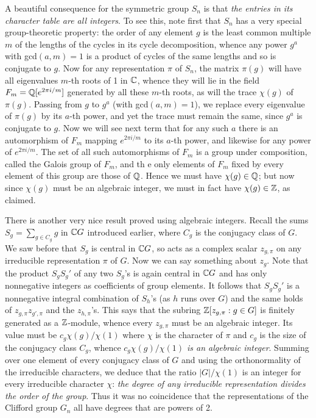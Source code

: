 \documentclass[10pt]{article}
\begin{document}
A beautiful consequence for the symmetric group $S_n$ is that {\sl the
  entries in its character table are all integers}. To see this, note
first that $S_n$ has a very special group-theoretic property: the order
of any element $g$ is the least common multiple $m$ of the lengths of
the cycles in its cycle decomposition, whence any power $g^a$ with
gcd$(a,m) = 1$ is a product of cycles of the same lengths and so is
conjugate to $g$. Now for any representation $\pi$ of $S_n$, the matrix
$\pi(g)$ will have all eigenvalues $m$-th roots of 1 in $\Bbb C$, whence
they will lie in the field $F_m = \Bbb Q[e^{2\pi i/m}]$ generated by all
these $m$-th roots, as will the trace $\chi(g)$ of $\pi(g)$. Passing
from $g$ to $g^a$ (with gcd$(a,m) = 1$), we replace every eigenvalue of
$\pi(g)$ by its $a$-th power, and yet the trace must remain the same,
since $g^a$ is conjugate to $g$. Now we will see next term that for any
such $a$ there is an automorphism of $F_m$ mapping $e^{2\pi i/m}$ to its
$a$-th power, and likewise for any power of $e^{2\pi i/m}$. The set of
all such automorphisms of $F_m$ is a group under composition, called the
Galois group of $F_m$, and th e only elements of $F_m$ fixed by every
element of this group are those of $\Bbb Q$. Hence we must have
$\chi(g)\in\Bbb Q$; but now since $\chi(g)$ must be an algebraic
integer, we must in fact have $\chi(g)\in\Bbb Z$, as claimed.

There is another very nice result proved using algebraic integers.
Recall the sums $S_g = \sum_{g\in C_g} g$ in $\Bbb CG$ introduced
earlier, where $C_g$ is the conjugacy class of $G$. We saw before that
$S_g$ is central in $\Bbb CG$, so acts as a complex scalar $z_{g,\pi}$
on any irreducible representation $\pi$ of $G$. Now we can say something
about $z_g$. Note that the product $S_g S_g'$ of any two $S_g$'s is
again central in $\Bbb CG$ and has only nonnegative integers as
coefficients of group elements. It follows that $S_g S_g'$ is a
nonnegative integral combination of $S_h$'s (as $h$ runs over $G$) and
the same holds of $z_{g,\pi} z_{g',\pi}$ and the $z_{h,\pi}$'s. This
says that the subring $\Bbb Z[z_{g,\pi}:g\in G]$ is finitely generated
as a $\Bbb Z$-module, whence every $z_{g,\pi}$ must be an algebraic
integer. Its value must be $c_g \chi(g)/\chi(1)$ where $\chi$ is the
character of $\pi$ and $c_g$ is the size of the conjugacy class $C_g$,
whence {\sl $c_g \chi(g)/\chi(1) $ is an algebraic integer}. Summing
over one element of every conjugacy class of $G$ and using the
orthonormality of the irreducible characters, we deduce that the ratio
$| G |/\chi(1)$ is an integer for every irreducible character $\chi$:
{\sl the degree of any irreducible representation divides the order of
  the group}. Thus it was no coincidence that the representations of the
Clifford group $G_n$ all have degrees that are powers of 2.
\end{document}
